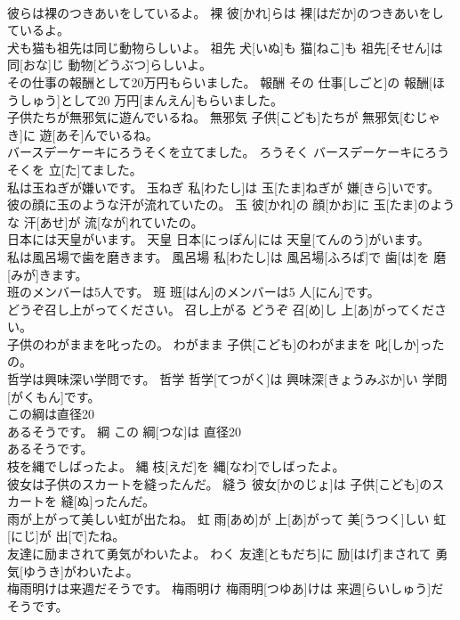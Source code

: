 \documentclass[8pt]{extreport}
\begin{document}
\begin{CJK}{UTF8}{min}
\\	彼らは裸のつきあいをしているよ。	裸	彼[かれ]らは 裸[はだか]のつきあいをしているよ。	
\\	犬も猫も祖先は同じ動物らしいよ。	祖先	犬[いぬ]も 猫[ねこ]も 祖先[そせん]は 同[おな]じ 動物[どうぶつ]らしいよ。	
\\	その仕事の報酬として20万円もらいました。	報酬	その 仕事[しごと]の 報酬[ほうしゅう]として20 万円[まんえん]もらいました。	
\\	子供たちが無邪気に遊んでいるね。	無邪気	子供[こども]たちが 無邪気[むじゃき]に 遊[あそ]んでいるね。	
\\	バースデーケーキにろうそくを立てました。	ろうそく	バースデーケーキにろうそくを 立[た]てました。	
\\	私は玉ねぎが嫌いです。	玉ねぎ	私[わたし]は 玉[たま]ねぎが 嫌[きら]いです。	
\\	彼の顔に玉のような汗が流れていたの。	玉	彼[かれ]の 顔[かお]に 玉[たま]のような 汗[あせ]が 流[なが]れていたの。	
\\	日本には天皇がいます。	天皇	日本[にっぽん]には 天皇[てんのう]がいます。	
\\	私は風呂場で歯を磨きます。	風呂場	私[わたし]は 風呂場[ふろば]で 歯[は]を 磨[みが]きます。	
\\	班のメンバーは5人です。	班	班[はん]のメンバーは5 人[にん]です。	
\\	どうぞ召し上がってください。	召し上がる	どうぞ 召[め]し 上[あ]がってください。	
\\	子供のわがままを叱ったの。	わがまま	子供[こども]のわがままを 叱[しか]ったの。	
\\	哲学は興味深い学問です。	哲学	哲学[てつがく]は 興味深[きょうみぶか]い 学問[がくもん]です。	
\\	この綱は直径20
\\	あるそうです。	綱	この 綱[つな]は 直径20
\\	[ちょっけい 
\\	せんち]あるそうです。	
\\	枝を縄でしばったよ。	縄	枝[えだ]を 縄[なわ]でしばったよ。	
\\	彼女は子供のスカートを縫ったんだ。	縫う	彼女[かのじょ]は 子供[こども]のスカートを 縫[ぬ]ったんだ。	
\\	雨が上がって美しい虹が出たね。	虹	雨[あめ]が 上[あ]がって 美[うつく]しい 虹[にじ]が 出[で]たね。	
\\	友達に励まされて勇気がわいたよ。	わく	友達[ともだち]に 励[はげ]まされて 勇気[ゆうき]がわいたよ。	
\\	梅雨明けは来週だそうです。	梅雨明け	梅雨明[つゆあ]けは 来週[らいしゅう]だそうです。	

\end{CJK}
\end{document}
